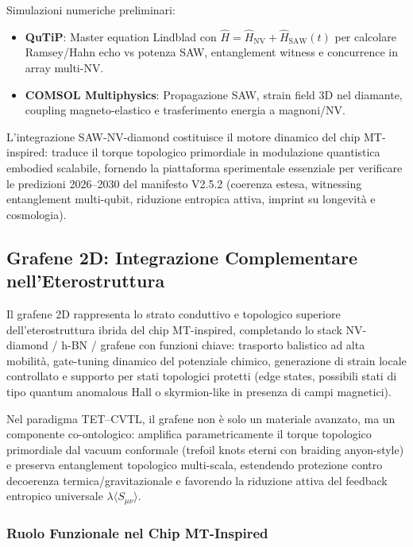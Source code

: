 \documentclass[12pt,a4paper]{article}
\begin{document}
Simulazioni numeriche preliminari:
\begin{itemize}
    \item \textbf{QuTiP}: Master equation Lindblad con $\hat{H} = \hat{H}_{\mathrm{NV}} + \hat{H}_{\mathrm{SAW}}(t)$ per calcolare Ramsey/Hahn echo vs potenza SAW, entanglement witness e concurrence in array multi-NV.
    \item \textbf{COMSOL Multiphysics}: Propagazione SAW, strain field 3D nel diamante, coupling magneto-elastico e trasferimento energia a magnoni/NV.
\end{itemize}

L'integrazione SAW-NV-diamond costituisce il motore dinamico del chip MT-inspired: traduce il torque topologico primordiale in modulazione quantistica embodied scalabile, fornendo la piattaforma sperimentale essenziale per verificare le predizioni 2026--2030 del manifesto V2.5.2 (coerenza estesa, witnessing entanglement multi-qubit, riduzione entropica attiva, imprint su longevità e cosmologia).


\subsection{Grafene 2D: Integrazione Complementare nell'Eterostruttura}

Il grafene 2D rappresenta lo strato conduttivo e topologico superiore dell'eterostruttura ibrida del chip MT-inspired, completando lo stack NV-diamond / h-BN / grafene con funzioni chiave: trasporto balistico ad alta mobilità, gate-tuning dinamico del potenziale chimico, generazione di strain locale controllato e supporto per stati topologici protetti (edge states, possibili stati di tipo quantum anomalous Hall o skyrmion-like in presenza di campi magnetici).  

Nel paradigma TET--CVTL, il grafene non è solo un materiale avanzato, ma un componente co-ontologico: amplifica parametricamente il torque topologico primordiale dal vacuum conformale (trefoil knots eterni con braiding anyon-style) e preserva entanglement topologico multi-scala, estendendo protezione contro decoerenza termica/gravitazionale e favorendo la riduzione attiva del feedback entropico universale $\lambda \langle S_{\mu\nu} \rangle$.

\subsubsection{Ruolo Funzionale nel Chip MT-Inspired}
\end{document}
